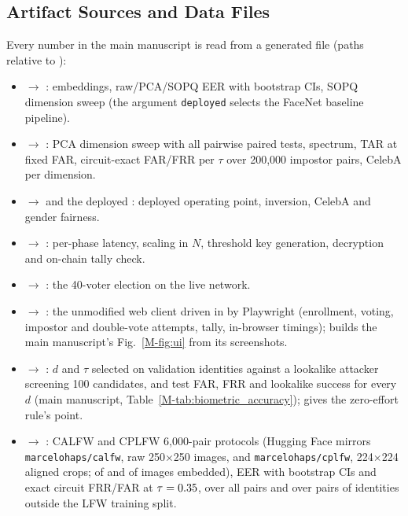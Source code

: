 \documentclass[10pt,letterpaper,journal]{IEEEtran}
\begin{document}
\subsection{Artifact Sources and Data Files}
Every number in the main manuscript is read from a generated file (paths relative to ):
\begin{itemize}[leftmargin=*,noitemsep]
  \item {} $\rightarrow$ : embeddings, raw/PCA/SOPQ EER with bootstrap CIs, SOPQ dimension sweep (the argument \texttt{deployed} selects the FaceNet baseline pipeline).
  \item {} $\rightarrow$ : PCA dimension sweep with all pairwise paired tests, spectrum, TAR at fixed FAR, circuit-exact FAR/FRR per $\tau$ over 200,000 impostor pairs, CelebA per dimension.
  \item {} $\rightarrow$  and the deployed : deployed operating point, inversion, CelebA and gender fairness.
  \item {} $\rightarrow$ : per-phase latency, scaling in $N$, threshold key generation, decryption and on-chain tally check.
  \item {} $\rightarrow$ : the 40-voter election on the live network.
  \item {} $\rightarrow$ : the unmodified web client driven in \nBrowserName{} by Playwright (enrollment, voting, impostor and double-vote attempts, tally, in-browser timings);  builds the main manuscript's Fig.~\ref{M-fig:ui} from its screenshots.
  \item {} $\rightarrow$ : $d$ and $\tau$ selected on validation identities against a lookalike attacker screening 100 candidates, and test FAR, FRR and lookalike success for every $d$ (main manuscript, Table~\ref{M-tab:biometric_accuracy});  gives the zero-effort rule's point.
  \item {} $\rightarrow$ : CALFW and CPLFW 6,000-pair protocols (Hugging Face mirrors \texttt{marcelohaps/calfw}, raw 250$\times$250 images, and \texttt{marcelohaps/cplfw}, 224$\times$224 aligned crops; \nCalfwEmbedded{} of \nCalfwImages{} and \nCplfwEmbedded{} of \nCplfwImages{} images embedded), EER with bootstrap CIs and exact circuit FRR/FAR at $\tau = 0.35$, over all pairs and over pairs of identities outside the LFW training split.

\end{itemize}
\end{document}
